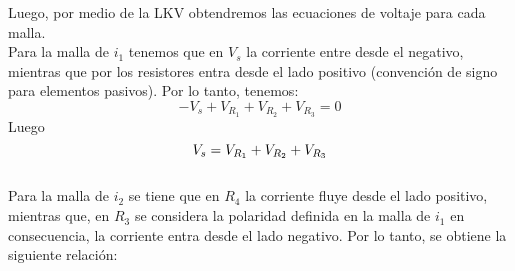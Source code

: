 \begin{example}
        Luego, por medio de la LKV obtendremos las ecuaciones de voltaje para cada malla.
        \\Para la malla de $i_1$ tenemos que en $V_s$ la corriente entre desde el negativo, mientras que por los resistores entra desde el lado positivo (convención de signo para elementos pasivos). Por lo tanto, tenemos:\\
        \begin{equation*}
        -V_s + V_{R_1} + V_{R_2} + V_{R_3} = 0
        \end{equation*}
        Luego
        \begin{equation*}
        \notag V_s=V_{R_1}+V_{R_2}+V_{R_3}
        \end{equation*} \\Para la malla de $i_2$ se tiene que en $R_4$ la corriente fluye desde el lado positivo, mientras que, en $R_3$ se considera la polaridad definida en la malla de $i_1$ en consecuencia, la corriente entra desde el lado negativo. Por lo tanto, se obtiene la siguiente relación:


\end{example}
